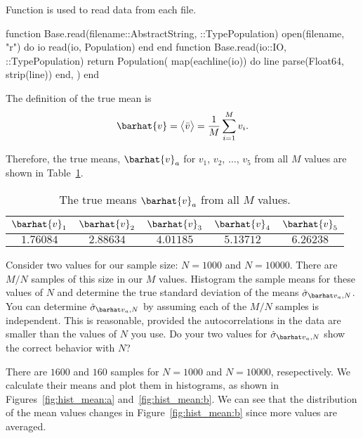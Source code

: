\begin{algorithm}
    \caption{Function  is used to read data from each file.}
    \label{lst:readdata}
    \begin{juliacode}
        function Base.read(filename::AbstractString, ::Type{Population})
            open(filename, "r") do io
                read(io, Population)
            end
        end
        function Base.read(io::IO, ::Type{Population})
            return Population(
                map(eachline(io)) do line
                    parse(Float64, strip(line))
                end,
            )
        end
    \end{juliacode}
\end{algorithm}

The definition of the true mean is
\begin{equation}
    \barhat{v} = \bigl \langle \bar{v} \bigr \rangle = \frac{ 1 }{ M } \sum_{i=1}^{M} v_i.
\end{equation}

Therefore, the true means, \(\barhat{v}_a\) for \(v_1\), \(v_2\), \(\ldots\), \(v_5\) from
all \(M\) values are shown in Table~\ref{tab:truemean}.

\begin{table}[hb]
    \centering
    \caption{The true means \(\barhat{v}_a\) from all \(M\) values.}
    \label{tab:truemean}
    \begin{tabular}{@{}ccccc@{}}
        \toprule
        \(\barhat{v}_1\) & \(\barhat{v}_2\) & \(\barhat{v}_3\) & \(\barhat{v}_4\) & \(\barhat{v}_5\) \\
        \midrule
        \(1.76084\)      & \(2.88634\)      & \(4.01185\)      & \(5.13712\)      & \(6.26238\)      \\
        \bottomrule
    \end{tabular}
\end{table}

\Question{} Consider two values for our sample size: \(N = 1000\) and \(N = 10000\). There are
\(M/N\) samples of this size in our \(M\) values. Histogram the sample means for these values of
\(N\) and determine the true standard deviation of the means \(\sgbar{a}\).
You can determine \(\sgbar{a}\) by assuming each of the \(M/N\) samples is
independent. This is reasonable, provided the autocorrelations in the data are smaller than
the values of \(N\) you use. Do your two values for \(\sgbar{a}\) show the
correct behavior with \(N\)?

\Answer{}
There are \(1600\) and \(160\) samples for \(N = 1000\) and \(N = 10000\), resepectively.
We calculate their means and plot them in histograms, as shown in
Figures~\ref{fig:hist_mean:a} and~\ref{fig:hist_mean:b}.
We can see that the distribution of the mean values changes in Figure~\ref{fig:hist_mean:b}
since more values are averaged.

